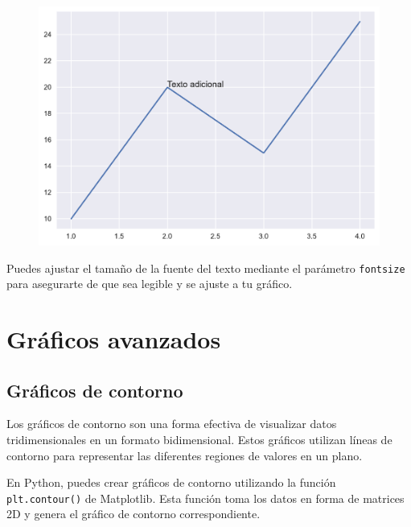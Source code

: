 \documentclass[
  a4paper,
]{article}
\begin{document}
\begin{figure}[H]

{\centering \includegraphics{index_files/figure-pdf/cell-14-output-1.pdf}

}

\end{figure}

Puedes ajustar el tamaño de la fuente del texto mediante el parámetro
\texttt{fontsize} para asegurarte de que sea legible y se ajuste a tu
gráfico.

\hypertarget{gruxe1ficos-avanzados}{%
\section{Gráficos avanzados}\label{gruxe1ficos-avanzados}}

\hypertarget{gruxe1ficos-de-contorno}{%
\subsection{Gráficos de contorno}\label{gruxe1ficos-de-contorno}}

Los gráficos de contorno son una forma efectiva de visualizar datos
tridimensionales en un formato bidimensional. Estos gráficos utilizan
líneas de contorno para representar las diferentes regiones de valores
en un plano.

En Python, puedes crear gráficos de contorno utilizando la función
\texttt{plt.contour()} de Matplotlib. Esta función toma los datos en
forma de matrices 2D y genera el gráfico de contorno correspondiente.
\end{document}
